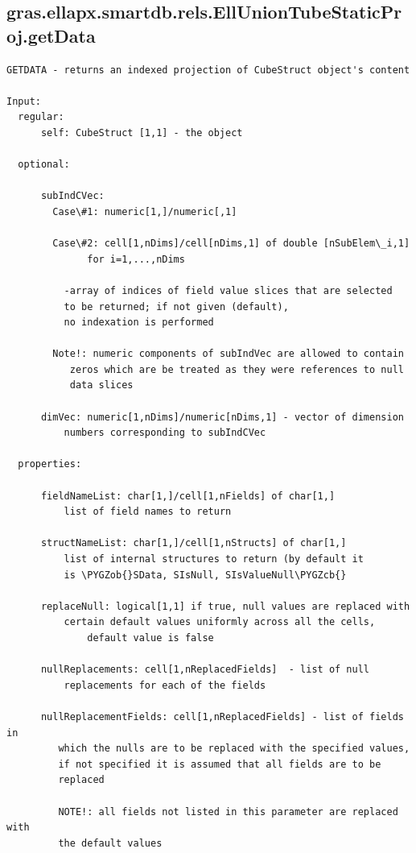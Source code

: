 \documentclass[letterpaper,10pt,english]{sphinxmanual}
\def\PYGZob{\char`\{}
\def\PYGZcb{\char`\}}
\begin{document}
\subsection{gras.ellapx.smartdb.rels.EllUnionTubeStaticProj.getData}
\label{chap_functions:gras-ellapx-smartdb-rels-elluniontubestaticproj-getdata}
\begin{Verbatim}[commandchars=\\\{\}]
GETDATA - returns an indexed projection of CubeStruct object's content

Input:
  regular:
      self: CubeStruct [1,1] - the object

  optional:

      subIndCVec:
        Case\#1: numeric[1,]/numeric[,1]

        Case\#2: cell[1,nDims]/cell[nDims,1] of double [nSubElem\_i,1]
              for i=1,...,nDims

          -array of indices of field value slices that are selected
          to be returned; if not given (default),
          no indexation is performed

        Note!: numeric components of subIndVec are allowed to contain
           zeros which are be treated as they were references to null
           data slices

      dimVec: numeric[1,nDims]/numeric[nDims,1] - vector of dimension
          numbers corresponding to subIndCVec

  properties:

      fieldNameList: char[1,]/cell[1,nFields] of char[1,]
          list of field names to return

      structNameList: char[1,]/cell[1,nStructs] of char[1,]
          list of internal structures to return (by default it
          is \PYGZob{}SData, SIsNull, SIsValueNull\PYGZcb{}

      replaceNull: logical[1,1] if true, null values are replaced with
          certain default values uniformly across all the cells,
              default value is false

      nullReplacements: cell[1,nReplacedFields]  - list of null
          replacements for each of the fields

      nullReplacementFields: cell[1,nReplacedFields] - list of fields in
         which the nulls are to be replaced with the specified values,
         if not specified it is assumed that all fields are to be
         replaced

         NOTE!: all fields not listed in this parameter are replaced with
         the default values


\end{Verbatim}
\end{document}
